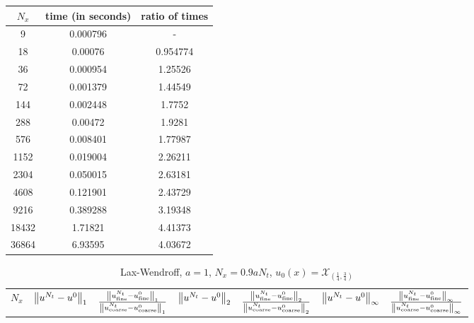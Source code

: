 \documentclass{article} %
\theoremstyle{plain}
\numberwithin{equation}{section} %
\numberwithin{figure}{section} %
\numberwithin{table}{section} %
\begin{document}
\begin{enumerate}[\ \ (a)]
\begin{table}[ht!]
\begin{tabular}{||c|c|c||c|c||c|c||}
            \end{tabular}
        \end{table}
        \vspace{-0.25cm}
        \begin{table}[ht!]
            \centering
            \begin{tabular}{||c|c|c||}\hline\hline
               $N_x$ & time (in seconds) & ratio of times \\
            \hline
                 9 &            0.000796 &         -        \\
                18 &            0.00076  &         0.954774 \\
                36 &            0.000954 &         1.25526  \\
                72 &            0.001379 &         1.44549  \\
               144 &            0.002448 &         1.7752   \\
               288 &            0.00472  &         1.9281   \\
               576 &            0.008401 &         1.77987  \\
              1152 &            0.019004 &         2.26211  \\
              2304 &            0.050015 &         2.63181  \\
              4608 &            0.121901 &         2.43729  \\
              9216 &            0.389288 &         3.19348  \\
             18432 &            1.71821  &         4.41373  \\
             36864 &            6.93595  &         4.03672  \\
             \hline\hline
            \end{tabular}
        \end{table}
        \FloatBarrier
        \begin{table}[ht!]
            \caption*{Lax-Wendroff, $a = 1$, $N_x = 0.9aN_t$, $u_0(x) = \mathcal{X}_{(\frac{1}{4},\frac{3}{4})}$}
            \centering
            \begin{tabular}{||c|c|c||c|c||c|c||}\hline\hline
               $N_x$ & $\norm{u^{N_t} - u^0}_1$ & $\frac{\norm{u_\text{fine}^{N_t} - u_\text{fine}^0}_1}{\norm{u_\text{coarse}^{N_t} - u_\text{coarse}^0}_1}$ & $\norm{u^{N_t} - u^0}_2$ & $\frac{\norm{u_\text{fine}^{N_t} - u_\text{fine}^0}_2}{\norm{u_\text{coarse}^{N_t} - u_\text{coarse}^0}_2}$ & $\norm{u^{N_t} - u^0}_\infty$ & $\frac{\norm{u_\text{fine}^{N_t} - u_\text{fine}^0}_\infty}{\norm{u_\text{coarse}^{N_t} - u_\text{coarse}^0}_\infty}$ \\

\end{tabular}
\end{table}
\end{enumerate}
\end{document}
